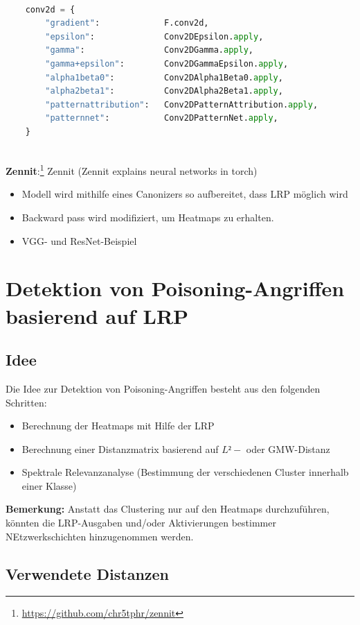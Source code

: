 \documentclass[twoside, 12pt,a4paper]{article}
\numberwithin{equation}{section}
\begin{document}
\begin{lstlisting}[language=Python, caption=Implementierte Regeln fhvilshoj]

	conv2d = {
		"gradient":             F.conv2d,
		"epsilon":              Conv2DEpsilon.apply,
		"gamma":                Conv2DGamma.apply,
		"gamma+epsilon":        Conv2DGammaEpsilon.apply,
		"alpha1beta0":          Conv2DAlpha1Beta0.apply,
		"alpha2beta1":          Conv2DAlpha2Beta1.apply,
		"patternattribution":   Conv2DPatternAttribution.apply,
		"patternnet":           Conv2DPatternNet.apply,
	}
	
\end{lstlisting}
	
	\noindent \textbf{Zennit}:\footnote{\url{https://github.com/chr5tphr/zennit}}
	Zennit (Zennit explains neural networks in torch) 
	\begin{itemize}
		\item Modell wird mithilfe eines Canonizers so aufbereitet, dass LRP möglich wird
		\item Backward pass wird modifiziert, um Heatmaps zu erhalten.
		\item VGG- und ResNet-Beispiel
	\end{itemize}
	\section{Detektion von Poisoning-Angriffen basierend auf LRP} \label{chapter_algorithm}
	\subsection{Idee}
	Die Idee zur Detektion von Poisoning-Angriffen besteht aus den folgenden Schritten:
	
	\begin{itemize}
		\item Berechnung der Heatmaps mit Hilfe der LRP
		\item Berechnung einer Distanzmatrix basierend auf $L²-$ oder GMW-Distanz
		\item Spektrale Relevanzanalyse (Bestimmung der verschiedenen Cluster innerhalb einer Klasse)
	\end{itemize}

	\noindent  \textbf{Bemerkung:} Anstatt das Clustering nur auf den Heatmaps durchzuführen, könnten die LRP-Ausgaben und/oder Aktivierungen bestimmer NEtzwerkschichten hinzugenommen werden.
	\subsection{Verwendete Distanzen}
	
\end{document}
